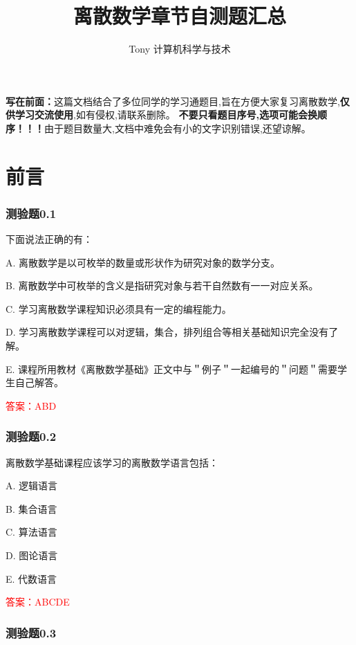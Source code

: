 \documentclass[UTF8, heading=true]{ctexart}
\title{\LARGE \textbf{离散数学章节自测题汇总}}
\author{Tony \hspace{2.89cm} 计算机科学与技术}
\begin{document}
\maketitle

\thispagestyle{fancy}

\textbf{写在前面：}这篇文档结合了多位同学的学习通题目,旨在方便大家复习离散数学,\textbf{仅供学习交流使用},如有侵权,请联系删除。
\textbf{不要只看题目序号,选项可能会换顺序！！！}由于题目数量大,文档中难免会有小的文字识别错误,还望谅解。


{}
\section*{前言}

\subsubsection{测验题0.1}

下面说法正确的有：

A. 离散数学是以可枚举的数量或形状作为研究对象的数学分支。

B. 离散数学中可枚举的含义是指研究对象与若干自然数有一一对应关系。

C. 学习离散数学课程知识必须具有一定的编程能力。

D. 学习离散数学课程可以对逻辑，集合，排列组合等相关基础知识完全没有了解。

E. 课程所用教材《离散数学基础》正文中与＂例子＂一起编号的＂问题＂需要学生自己解答。

\textcolor{red}{答案：ABD}

\subsubsection{测验题0.2}

离散数学基础课程应该学习的离散数学语言包括：

A. 逻辑语言

B. 集合语言

C. 算法语言

D. 图论语言

E. 代数语言

\textcolor{red}{答案：ABCDE}

\subsubsection{测验题0.3}
\end{document}
